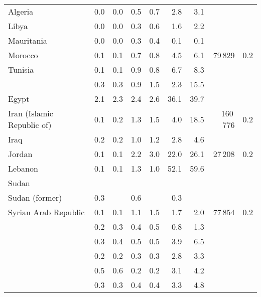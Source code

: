 \begin{longtable}{p{3cm}<{\raggedright}d{1.1}d{1.1}d{1.1}d{1.1}d{3.1}d{3.1}d{6.0}d{1.1}}
     \hspace{2pt}\hangindent=4pt\relax Algeria & 0.0 & 0.0 & 0.5 & 0.7 & 2.8 & 3.1 &  &  \\ 
     \hspace{2pt}\hangindent=4pt\relax Libya & 0.0 & 0.0 & 0.3 & 0.6 & 1.6 & 2.2 &  &  \\ 
     \hspace{2pt}\hangindent=4pt\relax Mauritania & 0.0 & 0.0 & 0.3 & 0.4 & 0.1 & 0.1 &  &  \\ 
     \hspace{2pt}\hangindent=4pt\relax Morocco & 0.1 & 0.1 & 0.7 & 0.8 & 4.5 & 6.1 & 79\,829 & 0.2 \\ 
     \hspace{2pt}\hangindent=4pt\relax Tunisia & 0.1 & 0.1 & 0.9 & 0.8 & 6.7 & 8.3 &  &  \\ 
   & 0.3 & 0.3 & 0.9 & 1.5 & 2.3 & 15.5 &  &  \\ 
     \hspace{2pt}\hangindent=4pt\relax Egypt & 2.1 & 2.3 & 2.4 & 2.6 & 36.1 & 39.7 &  &  \\ 
     \hspace{2pt}\hangindent=4pt\relax Iran (Islamic Republic of) & 0.1 & 0.2 & 1.3 & 1.5 & 4.0 & 18.5 & 160\,776 & 0.2 \\ 
     \hspace{2pt}\hangindent=4pt\relax Iraq & 0.2 & 0.2 & 1.0 & 1.2 & 2.8 & 4.6 &  &  \\ 
     \hspace{2pt}\hangindent=4pt\relax Jordan & 0.1 & 0.1 & 2.2 & 3.0 & 22.0 & 26.1 & 27\,208 & 0.2 \\ 
     \hspace{2pt}\hangindent=4pt\relax Lebanon & 0.1 & 0.1 & 1.3 & 1.0 & 52.1 & 59.6 &  &  \\ 
     \hspace{2pt}\hangindent=4pt\relax Sudan &  &  &  &  &  &  &  &  \\ 
     \hspace{2pt}\hangindent=4pt\relax Sudan (former) & 0.3 &  & 0.6 &  & 0.3 &  &  &  \\ 
     \hspace{2pt}\hangindent=4pt\relax Syrian Arab Republic & 0.1 & 0.1 & 1.1 & 1.5 & 1.7 & 2.0 & 77\,854 & 0.2 \\ 
   & 0.2 & 0.3 & 0.4 & 0.5 & 0.8 & 1.3 &  &  \\ 
   & 0.3 & 0.4 & 0.5 & 0.5 & 3.9 & 6.5 &  &  \\ 
   & 0.2 & 0.2 & 0.3 & 0.3 & 2.8 & 3.3 &  &  \\ 
   & 0.5 & 0.6 & 0.2 & 0.2 & 3.1 & 4.2 &  &  \\ 
   & 0.3 & 0.3 & 0.4 & 0.4 & 3.3 & 4.8 &  &  \\ 
  \hline
\end{longtable}
